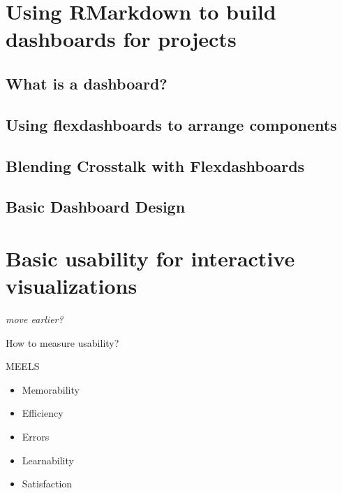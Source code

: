 \documentclass[
]{krantz}
\providecommand{\tightlist}{%
  \setlength{\itemsep}{0pt}\setlength{\parskip}{0pt}}
\begin{document}
\hypertarget{rmarkdown-dashboards}{%
\chapter{Using RMarkdown to build dashboards for projects}\label{rmarkdown-dashboards}}

\hypertarget{what-is-a-dashboard}{%
\section{What is a dashboard?}\label{what-is-a-dashboard}}

\hypertarget{using-flexdashboards-to-arrange-components}{%
\section{Using flexdashboards to arrange components}\label{using-flexdashboards-to-arrange-components}}

\hypertarget{blending-crosstalk-with-flexdashboards}{%
\section{Blending Crosstalk with Flexdashboards}\label{blending-crosstalk-with-flexdashboards}}

\hypertarget{basic-dashboard-design}{%
\section{Basic Dashboard Design}\label{basic-dashboard-design}}

\hypertarget{usability-for-visualizations}{%
\chapter{Basic usability for interactive visualizations}\label{usability-for-visualizations}}

\emph{move earlier?}

How to measure usability?

MEELS

\begin{itemize}
\tightlist
\item
  Memorability
\item
  Efficiency
\item
  Errors
\item
  Learnability
\item
  Satisfaction
\end{itemize}
\end{document}
